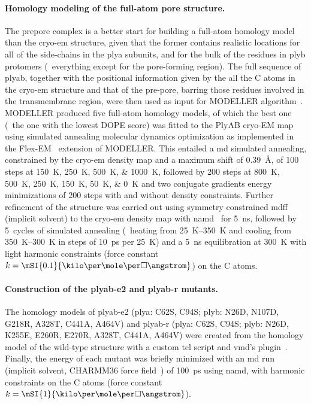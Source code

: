 \paragraph{Homology modeling of the full-atom pore structure.}
%
The prepore complex is a better start for building a full-atom homology model than the \gls{cryo-em}
structure, given that the former contains realistic locations for all of the side-chains in the \gls{plya}
subunits, and for the bulk of the residues in \gls{plyb} protomers (\ie~everything except for the pore-forming
region). The full sequence of \gls{plyab}, together with the positional information given by the all the
C\ta{} atoms in the \gls{cryo-em} structure and that of the pre-pore, barring those residues involved in the
transmembrane region, were then used as input for MODELLER  algorithm~\cite{Sali-1993}.
MODELLER produced five full-atom homology models, of which the best one (\ie~the one with the lowest DOPE
score) was fitted to the PlyAB cryo-EM map using simulated annealing molecular dynamics optimization as
implemented in the Flex-EM~\cite{Topf-2008} extension of MODELLER. This entailed a \gls{md} simulated
annealing, constrained by the \gls{cryo-em} density map and a maximum shift of \SI{0.39}{\angstrom}, of 100
steps at \SIlist{150;250;500;1000}{\kelvin}, followed by 200 steps at \SIlist{800;500;250;150;50;0}{\kelvin}
and two conjugate gradients energy minimizations of 200 steps with and without density constraints. Further
refinement of the structure was carried out using symmetry constrained \gls{mdff} (implicit solvent) to the
\gls{cryo-em} density map with \gls{namd}~\cite{Phillips-2005,McGreevy-2014} for \SI{5}{\ns}, followed by
5~cycles of simulated annealing (\ie~heating from \SIrange{25}{350}{\kelvin} and cooling from
\SIrange{350}{300}{\kelvin} in steps of \SI{10}{ps} per \SI{25}{\kelvin}) and a \SI{5}{\ns} equilibration at
\SI{300}{\kelvin} with light harmonic constraints (force constant $k =
\mSI{0.1}{\kilo\cal\per\mole\per\square\angstrom}$) on the C\ta{} atoms.

\paragraph{Construction of the \gls{plyab-e2} and \gls{plyab-r} mutants.}
%
The homology models of \gls{plyab-e2} (\gls{plya}: C62S, C94S; \gls{plyb}: N26D, N107D, G218R, A328T, C441A,
A464V) and \gls{plyab-r} (\gls{plya}: C62S, C94S; \gls{plyb}: N26D, K255E, E260R, E270R, A328T, C441A, A464V)
were created from the homology model of the wild-type structure with a custom \gls{tcl} script and \gls{vmd}'s
 plugin~\cite{Humphrey-1996}. Finally, the energy of each mutant was briefly minimized with an
\gls{md} run (implicit solvent, CHARMM36 force field~\cite{Best-2012}) of \SI{100}{\ps} using \gls{namd}, with
harmonic constraints on the C\ta{} atoms (force constant $k =
\mSI{1}{\kilo\cal\per\mole\per\square\angstrom}$).


